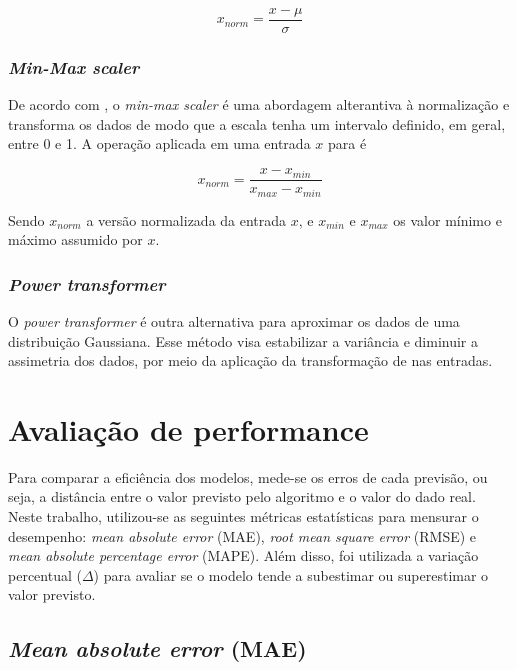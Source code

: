 \begin{equation}
  x_{norm} = \frac{x - \mu}{\sigma}
\end{equation}

\subsubsection{\textit{Min-Max scaler}}

De acordo com \citet{Raschka}, o \textit{min-max scaler} é uma 
abordagem alterantiva à normalização 
e transforma os dados de modo que a 
escala tenha um intervalo definido, em geral, entre
0 e 1. A operação aplicada em uma entrada $x$ para é

\begin{equation}
  x_{norm} = \frac{x - x_{min}}{x_{max} - x_{min}}
\end{equation}

Sendo $x_{norm}$ a versão normalizada da entrada $x$, e $x_{min}$ e $x_{max}$
os valor mínimo e máximo assumido por $x$. 

\subsubsection{\textit{Power transformer}}

O \textit{power transformer} é outra alternativa para aproximar os dados 
de uma distribuição Gaussiana. Esse método visa estabilizar a variância e 
diminuir a assimetria dos dados, por meio da aplicação da 
transformação de \citet{yeo} nas entradas. 


\section{Avaliação de performance}

Para comparar a eficiência dos modelos, mede-se os erros de 
cada previsão, ou seja, a distância entre o valor previsto 
pelo algoritmo e o valor do dado real. Neste trabalho, 
utilizou-se as seguintes métricas estatísticas para 
mensurar o desempenho: \textit{mean absolute error} (MAE),
\textit{root mean square  error} (RMSE) e \textit{mean 
absolute percentage error} (MAPE). Além disso, foi utilizada
a variação percentual ($\Delta$) para avaliar se o modelo tende 
a subestimar ou superestimar o valor previsto.

\subsection{\textit{Mean absolute error} (MAE)}


